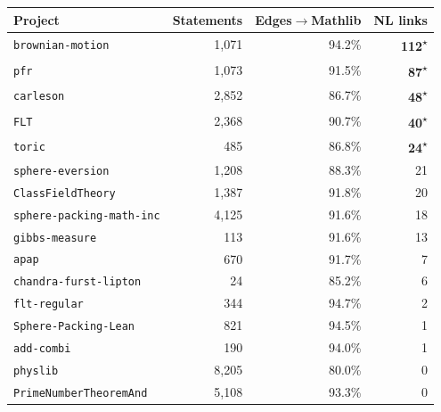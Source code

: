 \begin{table}[h]
  \centering
  \setlength{\tabcolsep}{4pt}
  \small
  \begin{tabular}{lrrr}
    \toprule
    \textbf{Project} & \textbf{Statements} & \textbf{Edges$\to$Mathlib} & \textbf{NL links} \\
    \midrule
    \texttt{brownian-motion}                 &   1,071 &  94.2\% & \textbf{112}\textsuperscript{\(\star\)} \\
    \texttt{pfr}                             &   1,073 &  91.5\% & \textbf{87}\textsuperscript{\(\star\)} \\
    \texttt{carleson}                        &   2,852 &  86.7\% & \textbf{48}\textsuperscript{\(\star\)} \\
    \texttt{FLT}                             &   2,368 &  90.7\% & \textbf{40}\textsuperscript{\(\star\)} \\
    \texttt{toric}                           &     485 &  86.8\% & \textbf{24}\textsuperscript{\(\star\)} \\
    \texttt{sphere-eversion}                 &   1,208 &  88.3\% &                             21 \\
    \texttt{ClassFieldTheory}                &   1,387 &  91.8\% &                             20 \\
    \texttt{sphere-packing-math-inc}         &   4,125 &  91.6\% &                             18 \\
    \texttt{gibbs-measure}                   &     113 &  91.6\% &                             13 \\
    \texttt{apap}                            &     670 &  91.7\% &                              7 \\
    \texttt{chandra-furst-lipton}            &      24 &  85.2\% &                              6 \\
    \texttt{flt-regular}                     &     344 &  94.7\% &                              2 \\
    \texttt{Sphere-Packing-Lean}             &     821 &  94.5\% &                              1 \\
    \texttt{add-combi}                       &     190 &  94.0\% &                              1 \\
    \texttt{physlib}                         &   8,205 &  80.0\% &                              0 \\
    \texttt{PrimeNumberTheoremAnd}           &   5,108 &  93.3\% &                              0 \\

\end{tabular}
\end{table}

